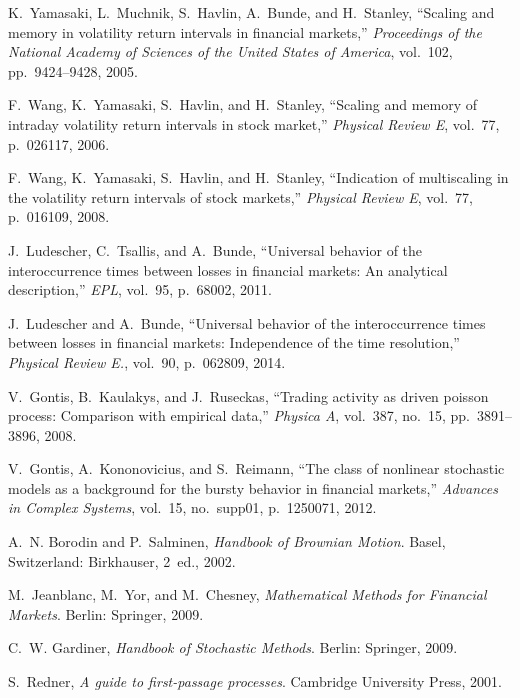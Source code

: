 \documentclass{article}
\begin{document}
\begin{thebibliography}{10}
K.~Yamasaki, L.~Muchnik, S.~Havlin, A.~Bunde, and H.~Stanley, ``Scaling and
  memory in volatility return intervals in financial markets,'' {\em
  Proceedings of the National Academy of Sciences of the United States of
  America}, vol.~102, pp.~9424--9428, 2005.

F.~Wang, K.~Yamasaki, S.~Havlin, and H.~Stanley, ``Scaling and memory of
  intraday volatility return intervals in stock market,'' {\em Physical Review
  E}, vol.~77, p.~026117, 2006.

F.~Wang, K.~Yamasaki, S.~Havlin, and H.~Stanley, ``Indication of multiscaling
  in the volatility return intervals of stock markets,'' {\em Physical Review
  E}, vol.~77, p.~016109, 2008.

J.~Ludescher, C.~Tsallis, and A.~Bunde, ``Universal behavior of the
  interoccurrence times between losses in financial markets: An analytical
  description,'' {\em EPL}, vol.~95, p.~68002, 2011.

J.~Ludescher and A.~Bunde, ``Universal behavior of the interoccurrence times
  between losses in financial markets: Independence of the time resolution,''
  {\em Physical Review E.}, vol.~90, p.~062809, 2014.

V.~Gontis, B.~Kaulakys, and J.~Ruseckas, ``Trading activity as driven poisson
  process: Comparison with empirical data,'' {\em Physica A}, vol.~387, no.~15,
  pp.~3891--3896, 2008.

V.~Gontis, A.~Kononovicius, and S.~Reimann, ``The class of nonlinear stochastic
  models as a background for the bursty behavior in financial markets,'' {\em
  Advances in Complex Systems}, vol.~15, no.~supp01, p.~1250071, 2012.

A.~N. Borodin and P.~Salminen, {\em Handbook of Brownian Motion}.
\newblock Basel, Switzerland: Birkhauser, 2~ed., 2002.

M.~Jeanblanc, M.~Yor, and M.~Chesney, {\em Mathematical Methods for Financial
  Markets}.
\newblock Berlin: Springer, 2009.

C.~W. Gardiner, {\em Handbook of Stochastic Methods}.
\newblock Berlin: Springer, 2009.

S.~Redner, {\em A guide to first-passage processes}.
\newblock Cambridge University Press, 2001.


\end{thebibliography}
\end{document}
